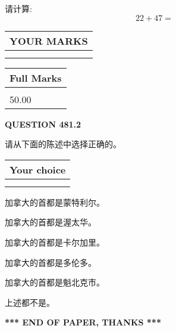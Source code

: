 \documentclass{ctexart}
\begin{document}
  
 
请计算:
\begin{equation}
22 +  %
47 = \nonumber
\end{equation}
 

 

 
  
\vspace{0.2in}
  
\noindent\begin{tabular}{|l|}
\hline
 YOUR MARKS  \\
\hline
 \\ 
 \\ 
\hline
\end{tabular}
\hspace{0.05in} \begin{tabular}{|l|}
\hline
 Full Marks  \\
\hline
 \\ 
50.00 \\
\hline
\end{tabular}
{\textbf{\Large{QUESTION
481.2 
}}}
  
  
请从下面的陈述中选择正确的。
  
  
\noindent\hspace{3.0in} \begin{tabular}{|l|}
\hline
Your choice \\
\hline
 \\ 
 \\ 
\hline
\end{tabular}
  
  
 
 
加拿大的首都是蒙特利尔。
 
 
加拿大的首都是渥太华。
 
 
加拿大的首都是卡尔加里。
 
 
加拿大的首都是多伦多。
 
 
加拿大的首都是魁北克市。
 
 
 上述都不是。
 
 
   
   
 \vspace{0.2in}
 
   
   
   
   
\vspace{1.0in} 
{\textbf{\large{ *** END OF PAPER, THANKS *** }}} 
   
\end{document}
